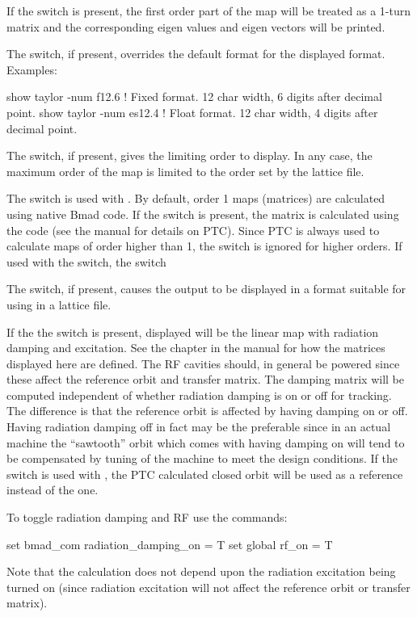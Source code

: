 {{{{{{{{{{If the  switch is present, the first order part of the map will be treated as a
1-turn matrix and the corresponding eigen values and eigen vectors will be printed.

The  switch, if present, overrides the default format for the displayed format.
Examples:
\begin{example}
  show taylor -num f12.6  ! Fixed format. 12 char width, 6 digits after decimal point.
  show taylor -num es12.4 ! Float format. 12 char width, 4 digits after decimal point.
\end{example}

The  switch, if present, gives the limiting order to display. In any case, the
maximum order of the map is limited to the order set by the lattice file.

The  switch is used with . By default, order 1 maps (matrices) are calculated
using native Bmad code. If the  switch is present, the matrix is calculated using the
 code (see the \bmad manual for details on PTC). Since PTC is always used to calculate maps
of order higher than 1, the  switch is ignored for higher orders. If used with the
 switch, the  switch 

The  switch, if present, causes the output to be displayed in a format suitable
for using in a \bmad lattice file.

If the the  switch is present, displayed will be the linear map with radiation
damping and excitation. See the  chapter in the \bmad manual for how the
matrices displayed here are defined. The RF cavities should, in general be powered since these
affect the reference orbit and transfer matrix. The damping matrix will be computed independent of
whether radiation damping is on or off for tracking. The difference is that the reference orbit is
affected by having damping on or off. Having radiation damping off in fact may be the preferable
since in an actual machine the ``sawtooth'' orbit which comes with having damping on will tend to be
compensated by tuning of the machine to meet the design conditions. If the  switch is used
with , the PTC calculated closed orbit will be used as a reference instead of the
\bmad one.

To toggle radiation damping and RF use the commands:
\begin{example}
  set bmad_com radiation_damping_on = T
  set global rf_on = T
\end{example}
Note that the calculation does not depend upon the radiation excitation being turned on (since
radiation excitation will not affect the reference orbit or transfer matrix).

}}}}}}}}}}
